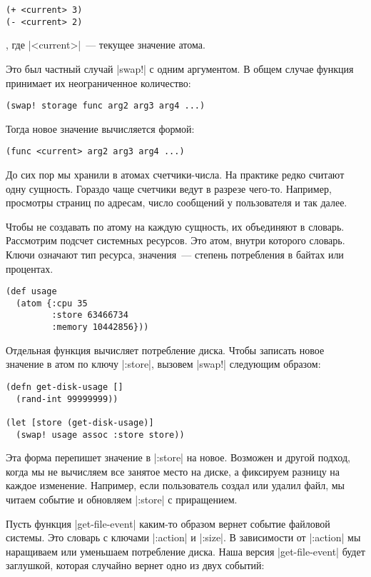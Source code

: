 \begin{verbatim}
(+ <current> 3)
(- <current> 2)
\end{verbatim}

\noindent
, где \spverb|<current>|~--- текущее значение атома.

Это был частный случай \spverb|swap!| с одним аргументом. В общем случае функция
принимает их неограниченное количество:

\begin{verbatim}
(swap! storage func arg2 arg3 arg4 ...)
\end{verbatim}

\noindent
Тогда новое значение вычисляется формой:

\begin{verbatim}
(func <current> arg2 arg3 arg4 ...)
\end{verbatim}

До сих пор мы хранили в атомах счетчики-числа. На практике редко считают одну
сущность. Гораздо чаще счетчики ведут в разрезе чего-то. Например, просмотры
страниц по адресам, число сообщений у пользователя и так далее.

Чтобы не создавать по атому на каждую сущность, их объединяют в
словарь. Рассмотрим подсчет системных ресурсов. Это атом, внутри которого
словарь. Ключи означают тип ресурса, значения~--- степень потребления в байтах
или процентах.

\begin{verbatim}
(def usage
  (atom {:cpu 35
         :store 63466734
         :memory 10442856}))
\end{verbatim}

Отдельная функция вычисляет потребление диска. Чтобы записать новое значение в
атом по ключу \spverb|:store|, вызовем \spverb|swap!| следующим образом:

\begin{verbatim}
(defn get-disk-usage []
  (rand-int 99999999))

(let [store (get-disk-usage)]
  (swap! usage assoc :store store))
\end{verbatim}

Эта форма перепишет значение в \spverb|:store| на новое. Возможен и другой
подход, когда мы не вычисляем все занятое место на диске, а фиксируем разницу на
каждое изменение. Например, если пользователь создал или удалил файл, мы читаем
событие и обновляем \spverb|:store| с приращением.

Пусть функция \spverb|get-file-event| каким-то образом вернет событие файловой
системы. Это словарь с ключами \spverb|:action| и \spverb|:size|. В зависимости
от \spverb|:action| мы наращиваем или уменьшаем потребление диска. Наша версия
\spverb|get-file-event| будет заглушкой, которая случайно вернет одно из двух
событий:

